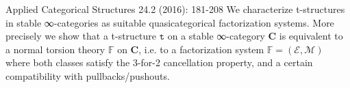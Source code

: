 \begin{eyenumerate}
   \item {}
   {Applied Categorical Structures 24.2 (2016): 181-208}
   {We characterize t-structures in stable ∞-categories as suitable quasicategorical factorization systems. More precisely we show that a t-structure $\texttt{t}$ on a stable ∞-category $\textbf{C}$ is equivalent to a normal torsion theory $\mathbb{F}$ on $\textbf{C}$, i.e. to a factorization system $\mathbb{F}=(\mathcal{E},\mathcal{M})$ where both classes satisfy the 3-for-2 cancellation property, and a certain compatibility with pullbacks/pushouts.}
\end{eyenumerate}

